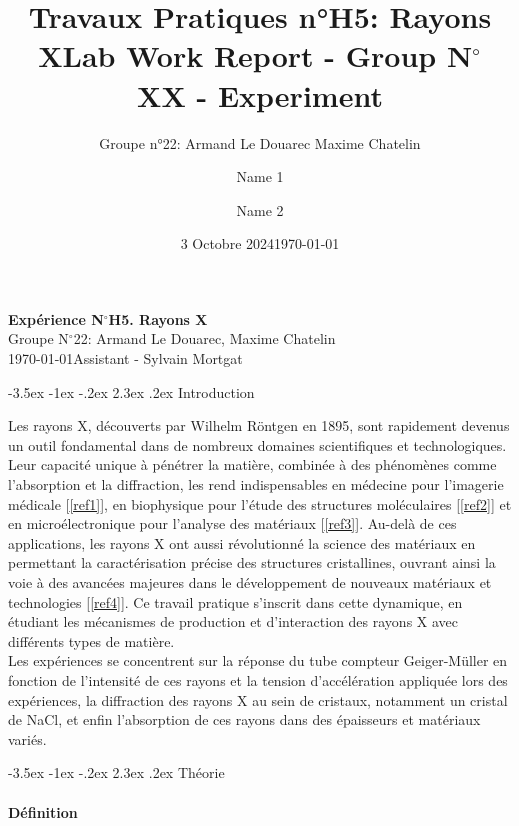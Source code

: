 \documentclass[a4paper, 12pt,oneside]{article}
\title{Travaux Pratiques n°H5: Rayons X}
\author{Groupe n°22: Armand Le Douarec Maxime Chatelin}
\date{3 Octobre 2024}
\makeatletter
\renewcommand{\section}{\@startsection {section}{1}{\z@}%
             {-3.5ex \@plus -1ex \@minus -.2ex}%
             {2.3ex \@plus.2ex}%
             {\normalfont\normalsize\bfseries}}
\makeatother
\begin{document}
\title{\normalsize{Lab Work Report - Group N$^\circ$\\ XX - Experiment}}
\date{\normalsize{\today}}
\author{\normalsize{Name} 1\and \normalsize{Name 2}}

\begin{center}
\large\textbf{\sffamily Expérience N$^\circ$H5. Rayons X}\\%
\large\sffamily Groupe N$^\circ$22: Armand Le Douarec, Maxime Chatelin\\%
\large\sffamily\today\quad   Assistant -  Sylvain Mortgat \\%
\end{center}

\section{Introduction}

Les rayons X, découverts par Wilhelm Röntgen en 1895, sont rapidement devenus un outil fondamental dans de nombreux domaines scientifiques et technologiques. Leur capacité unique à pénétrer la matière, combinée à des phénomènes comme l’absorption et la diffraction, les rend indispensables en médecine pour l’imagerie médicale [\ref{ref1}], en biophysique pour l’étude des structures moléculaires [\ref{ref2}] et en microélectronique pour l’analyse des matériaux [\ref{ref3}]. Au-delà de ces applications, les rayons X ont aussi révolutionné la science des matériaux en permettant la caractérisation précise des structures cristallines, ouvrant ainsi la voie à des avancées majeures dans le développement de nouveaux matériaux et technologies [\ref{ref4}]. Ce travail pratique s’inscrit dans cette dynamique, en étudiant les mécanismes de production et d’interaction des rayons X avec différents types de matière.\\
Les expériences se concentrent sur la réponse du tube compteur Geiger-Müller en fonction de l'intensité de ces rayons et la tension d'accélération appliquée lors des expériences, la diffraction des rayons X au sein de cristaux, notamment un cristal de NaCl, et enfin l’absorption de ces rayons dans des épaisseurs et matériaux variés.
\vspace{-0.23cm}

\section{Théorie}
\vspace{-0.17cm}
\paragraph{Définition}
\end{document}
